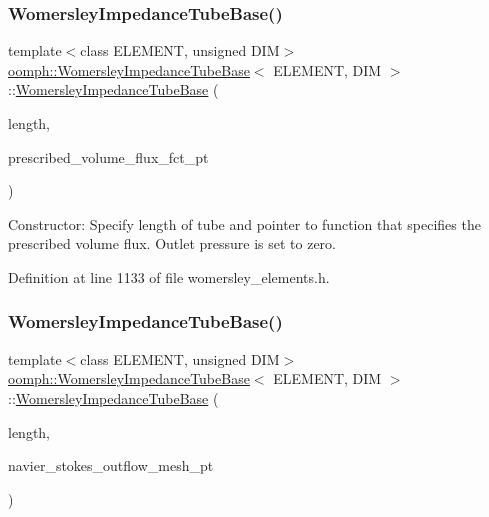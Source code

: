 \subsubsection{\texorpdfstring{Womersley\+Impedance\+Tube\+Base()}{WomersleyImpedanceTubeBase()}\hspace{0.1cm}{\footnotesize\ttfamily [1/2]}}
{\footnotesize\ttfamily template$<$class E\+L\+E\+M\+E\+NT, unsigned D\+IM$>$ \\
\hyperlink{classoomph_1_1WomersleyImpedanceTubeBase}{oomph\+::\+Womersley\+Impedance\+Tube\+Base}$<$ E\+L\+E\+M\+E\+NT, D\+IM $>$\+::\hyperlink{classoomph_1_1WomersleyImpedanceTubeBase}{Womersley\+Impedance\+Tube\+Base} (\begin{DoxyParamCaption}\item[{const double \&}]{length,  }\item[{\hyperlink{classoomph_1_1WomersleyImpedanceTubeBase_a329107c12ef8f97c5afd4e0ae5d67b70}{Prescribed\+Volume\+Flux\+Fct\+Pt}}]{prescribed\+\_\+volume\+\_\+flux\+\_\+fct\+\_\+pt }\end{DoxyParamCaption})\hspace{0.3cm}{\ttfamily [inline]}}



Constructor\+: Specify length of tube and pointer to function that specifies the prescribed volume flux. Outlet pressure is set to zero. 



Definition at line 1133 of file womersley\+\_\+elements.\+h.

\mbox{\label{classoomph_1_1WomersleyImpedanceTubeBase_a79e8b7fb0c3edb3956aef7cf7c8bf719}} 
\subsubsection{\texorpdfstring{Womersley\+Impedance\+Tube\+Base()}{WomersleyImpedanceTubeBase()}\hspace{0.1cm}{\footnotesize\ttfamily [2/2]}}
{\footnotesize\ttfamily template$<$class E\+L\+E\+M\+E\+NT, unsigned D\+IM$>$ \\
\hyperlink{classoomph_1_1WomersleyImpedanceTubeBase}{oomph\+::\+Womersley\+Impedance\+Tube\+Base}$<$ E\+L\+E\+M\+E\+NT, D\+IM $>$\+::\hyperlink{classoomph_1_1WomersleyImpedanceTubeBase}{Womersley\+Impedance\+Tube\+Base} (\begin{DoxyParamCaption}\item[{const double \&}]{length,  }\item[{\hyperlink{classoomph_1_1Mesh}{Mesh} $\ast$}]{navier\+\_\+stokes\+\_\+outflow\+\_\+mesh\+\_\+pt }\end{DoxyParamCaption})\hspace{0.3cm}{\ttfamily [inline]}}



